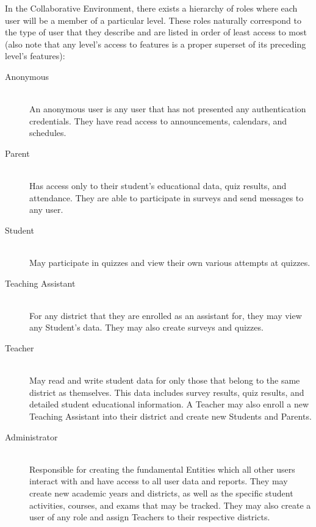 In the Collaborative Environment, there exists a hierarchy of roles where each user will be a member of a particular level. These roles naturally correspond to the type of user that they describe and are listed in order of least access to most (also note that any level's access to features is a proper superset of its preceding level's features):

\begin{description}
	\item [Anonymous] \hfill \\ An anonymous user is any user that has not presented any authentication credentials. They have read access to announcements, calendars, and schedules.
	\item [Parent] \hfill \\ Has access only to their student's educational data, quiz results, and attendance. They are able to participate in surveys and send messages to any user.
	\item [Student] \hfill \\ May participate in quizzes and view their own various attempts at quizzes.
	\item [Teaching Assistant] \hfill \\ For any district that they are enrolled as an assistant for, they may view any Student's data. They may also create surveys and quizzes.
	\item [Teacher] \hfill \\ May read and write student data for only those that belong to the same district as themselves. This data includes survey results, quiz results, and detailed student educational information. A Teacher may also enroll a new Teaching Assistant into their district and  create new Students and Parents.
	\item [Administrator] \hfill \\ Responsible for creating the fundamental Entities which all other users interact with and have access to all user data and reports. They may create new academic years and districts, as well as the specific student activities, courses, and exams that may be tracked. They may also create a user of any role and assign Teachers to their respective districts.
\end{description}